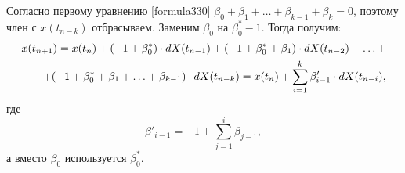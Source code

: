 Согласно первому уравнению \eqref{formula330} $\beta_0 + \beta_1 + \dots + \beta_{k-1} + \beta_k = 0$, поэтому член с $x(t_{n-k})$ отбрасываем. Заменим $\beta_0$ на $\beta_0^{*}-1$. Тогда получим:
\begin{align}
\label{formula336}
x(t_{n+1})=x(t_n)+(-1+\beta_0^{*}) \cdot dX(t_{n-1}) + (-1+\beta_0^{*}+\beta_1) \cdot dX(t_{n-2}) + \dots + \notag \\
+ (-1+\beta_0^{*} + \beta_1 + \dots + \beta_{k-1}) \cdot dX(t_{n-k}) = x(t_n) + \sum_{i=1}^{k} \beta'_{i-1} \cdot dX(t_{n-i}),
\end{align} 
где 
\begin{equation}
\label{formula337}
\beta'_{i-1}=-1+\sum_{j=1}^{i} \beta_{j-1},
\end{equation} 
а вместо $\beta_0$ используется $\beta_0^{*}$.





















